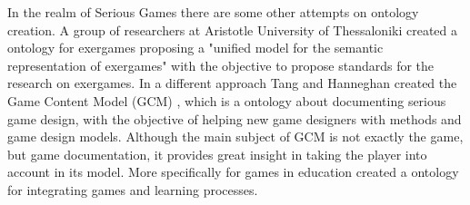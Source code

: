 In the realm of Serious Games there are some other attempts on ontology creation. A group of researchers at Aristotle University of Thessaloniki created a ontology for exergames proposing a "unified model for the semantic representation of exergames" \citep{bamparopoulos_towards_2016} with the objective to propose standards for the research on exergames. In a different approach Tang and Hanneghan created the Game Content Model (GCM) \citep{tang_game_2011}, which is a ontology about documenting serious game design, with the objective of helping new game designers with methods and game design models. Although the main subject of GCM is not exactly the game, but game documentation, it provides great insight in taking the player into account in its model. More specifically for games in education \cite{ghannem2011defining} created a ontology for integrating games and learning processes.